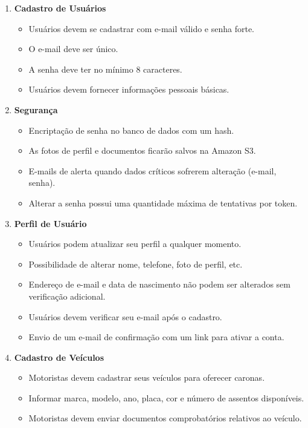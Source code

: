 \begin{enumerate}
	
	\item \textbf{Cadastro de Usuários}
	\begin{itemize}
		\item Usuários devem se cadastrar com e-mail válido e senha forte.
		\item O e-mail deve ser único.
		\item A senha deve ter no mínimo 8 caracteres.
		\item Usuários devem fornecer informações pessoais básicas.
		
	\end{itemize}
	
	\item \textbf{Segurança}
	
	\begin{itemize}
		\item Encriptação de senha no banco de dados com um hash.
		\item As fotos de perfil e documentos ficarão salvos na Amazon S3.
		\item E-mails de alerta quando dados críticos sofrerem alteração (e-mail, senha).
		\item Alterar a senha possui uma quantidade máxima de tentativas por token.
	\end{itemize}
	
	\item \textbf{Perfil de Usuário}
	
	\begin{itemize}
		\item Usuários podem atualizar seu perfil a qualquer momento.
		\item Possibilidade de alterar nome, telefone, foto de perfil, etc.
		\item Endereço de e-mail e data de nascimento não podem ser alterados sem verificação adicional.
		\item Usuários devem verificar seu e-mail após o cadastro.
		\item Envio de um e-mail de confirmação com um link para ativar a conta.
	\end{itemize}
	
	\item \textbf{Cadastro de Veículos}
	
	\begin{itemize}
		\item Motoristas devem cadastrar seus veículos para oferecer caronas.
		\item Informar marca, modelo, ano, placa, cor e número de assentos disponíveis.
		\item Motoristas devem enviar documentos comprobatórios relativos ao veículo.
	\end{itemize}
	

\end{enumerate}
